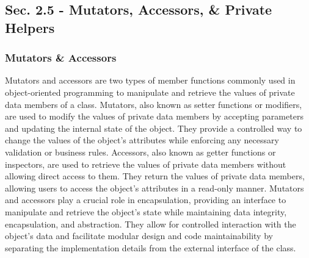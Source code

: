 \subsection*{Sec. 2.5 - Mutators, Accessors, \& Private Helpers}
\subsubsection*{Mutators \& Accessors}

Mutators and accessors are two types of member functions commonly used in object-oriented programming to manipulate and retrieve the values of private data members of a class. Mutators, also known as setter functions or 
modifiers, are used to modify the values of private data members by accepting parameters and updating the internal state of the object. They provide a controlled way to change the values of the object's attributes while 
enforcing any necessary validation or business rules. Accessors, also known as getter functions or inspectors, are used to retrieve the values of private data members without allowing direct access to them. They return 
the values of private data members, allowing users to access the object's attributes in a read-only manner. Mutators and accessors play a crucial role in encapsulation, providing an interface to manipulate and retrieve 
the object's state while maintaining data integrity, encapsulation, and abstraction. They allow for controlled interaction with the object's data and facilitate modular design and code maintainability by separating the 
implementation details from the external interface of the class.

